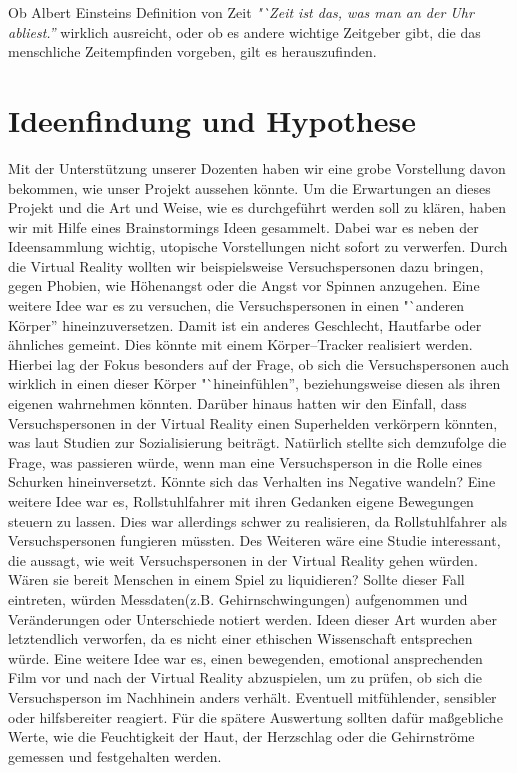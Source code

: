 \documentclass{Bericht}
\begin{document}
	Ob  Albert Einsteins Definition von Zeit \textit{"`Zeit ist das, was man an der Uhr abliest.'' } wirklich ausreicht, oder ob es andere wichtige Zeitgeber gibt, die das menschliche Zeitempfinden vorgeben, gilt es herauszufinden. 

\newpage
\section{Ideenfindung und Hypothese} %
	Mit der Unterstützung unserer Dozenten haben wir eine grobe Vorstellung davon bekommen, wie unser Projekt aussehen könnte. Um die Erwartungen an dieses Projekt und die Art und Weise, wie es durchgeführt werden soll zu klären, haben wir mit Hilfe eines Brainstormings Ideen gesammelt. Dabei war es neben der Ideensammlung wichtig, utopische Vorstellungen nicht sofort zu verwerfen. Durch die Virtual Reality wollten wir beispielsweise Versuchspersonen dazu bringen, gegen Phobien, wie Höhenangst oder die Angst vor Spinnen anzugehen. Eine weitere Idee war es zu versuchen, die Versuchspersonen in einen "`anderen Körper'' hineinzuversetzen. Damit ist ein anderes Geschlecht, Hautfarbe oder ähnliches gemeint. Dies könnte mit einem Körper–Tracker realisiert werden. Hierbei lag der Fokus besonders auf der Frage, ob sich die Versuchspersonen auch wirklich in einen dieser Körper "`hineinfühlen'', beziehungsweise diesen als ihren eigenen wahrnehmen könnten. Darüber hinaus hatten wir den Einfall, dass Versuchspersonen in der Virtual Reality einen Superhelden verkörpern könnten, was laut Studien zur Sozialisierung beiträgt. 
Natürlich stellte sich demzufolge die Frage, was passieren würde, wenn man eine Versuchsperson in die Rolle eines Schurken hineinversetzt. Könnte sich das Verhalten ins Negative wandeln? Eine weitere Idee war es, Rollstuhlfahrer mit ihren Gedanken eigene Bewegungen steuern zu lassen. Dies war allerdings schwer zu realisieren, da Rollstuhlfahrer als Versuchspersonen fungieren müssten. Des Weiteren wäre eine Studie interessant, die aussagt, wie weit Versuchspersonen in der Virtual Reality gehen würden. Wären sie bereit Menschen in einem Spiel zu liquidieren? Sollte dieser Fall eintreten, würden Messdaten(z.B. Gehirnschwingungen) aufgenommen und Veränderungen oder Unterschiede notiert werden. Ideen dieser Art wurden aber letztendlich verworfen, da es nicht einer ethischen Wissenschaft entsprechen würde. Eine weitere Idee war es, einen bewegenden, emotional ansprechenden Film vor und nach der Virtual Reality abzuspielen, um zu prüfen, ob sich die Versuchsperson im Nachhinein anders verhält. Eventuell mitfühlender, sensibler oder hilfsbereiter reagiert. Für die spätere Auswertung sollten dafür maßgebliche Werte, wie die Feuchtigkeit der Haut, der Herzschlag oder die Gehirnströme gemessen und festgehalten werden.
\end{document}
